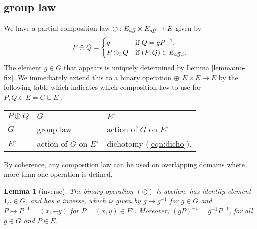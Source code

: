\documentclass[12pt]{article}
\newtheorem{lemma}[theorem]{Lemma}
\newcommand{\op}[1]{\hbox{#1}}
\newcommand{\Eaff}{E_{\op{\scriptsize\it aff}}}
\newcommand{\Eaf}[1]{E_{\op{\scriptsize\it aff},{#1}}}
\newcommand{\Eoo}{E^{\circ}}
\newcommand{\hplus}{\oplus}
\begin{document}
\subsection{group law}

We have a partial composition law 
$\oplus:\Eaff\times\Eaff\to E$ given by
\begin{equation}\label{eqn:dicho}
P\oplus Q = \begin{cases}
g & \text{if } Q = g P^{-1},\\
P\oplus_i Q & \text{if } (P,Q)\in \Eaf{i}.
\end{cases}
\end{equation}
The element $g\in G$ that appears is uniquely determined by Lemma
\ref{lemma:no-fix}.  
We immediately extend this to a binary operation $\oplus:E\times E\to
E$ by the following table which indicates which composition law to use for
$P,Q\in E= G\sqcup \Eoo$:

{
\centering
\begin{tabular}{l || l | l}
$P\oplus Q$ & $G$ & $\Eoo$ \\ \hline \hline
$G$ & group law & action of $G$ on $\Eoo$\\
$\Eoo$ & action of $G$ on $\Eoo$ & dichotomy (\ref{eqn:dicho}).
\end{tabular}
}


By coherence, any composition law can be used on
overlapping domains where more than one operation is defined.

\begin{lemma}[inverse]\label{lemma:inv2} 
The binary operation $(\hplus)$ is abelian, has identity
  element $1_G\in G$, and has a inverse, which
   is given by $g\mapsto g^{-1}$ for $g\in G$
  and $P\mapsto P^{-1} = (x,-y)$ for $P=(x,y)\in \Eoo$.  Moreover, 
  $(g P)^{-1} = g^{-1} P^{-1}$, for all $g\in G$ and $P\in E$.
\end{lemma}
\end{document}
